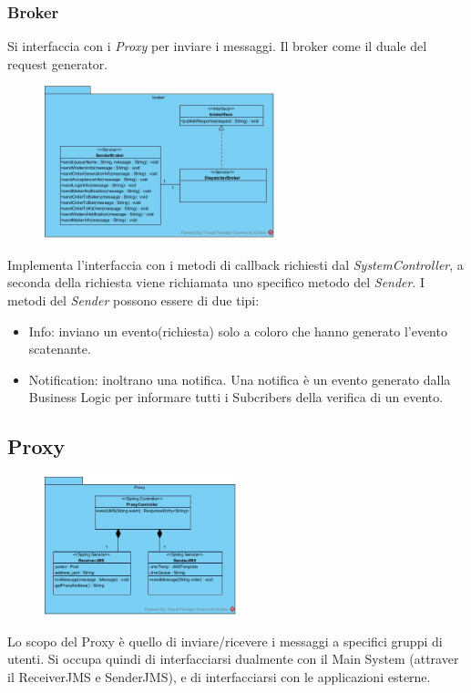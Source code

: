 \subsubsection{Broker}
Si interfaccia con i \textit{Proxy} per inviare i messaggi. Il broker come il duale del request generator.
\begin{figure}[H]
	\centering
	\includegraphics[width=0.6\textwidth]{Immagini/broker.jpg}
\end{figure}
Implementa l'interfaccia con i metodi di callback richiesti dal \textit{SystemController}, a seconda della richiesta viene richiamata uno specifico metodo del \textit{Sender}.
I metodi del \textit{Sender} possono essere di due tipi:
\begin{itemize}
	\item Info: inviano un evento(richiesta) solo a coloro che hanno generato l'evento scatenante.
	\item Notification: inoltrano una notifica. Una notifica è un evento generato dalla Business Logic per informare tutti i Subcribers della verifica di un evento.
\end{itemize}

\subsection{Proxy}
 \begin{figure}[H]
	\centering
	\includegraphics[width=0.5\textwidth]{Immagini/proxy_classdiagram.jpg}
\end{figure}
Lo scopo del Proxy è quello di inviare/ricevere i messaggi a specifici gruppi di utenti. Si occupa quindi di interfacciarsi dualmente con il Main System (attraver il ReceiverJMS e SenderJMS), e di interfacciarsi con le applicazioni esterne.

